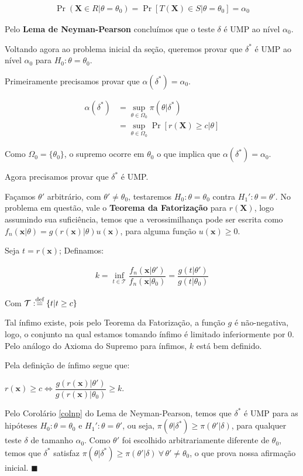 \documentclass[a4paper,10pt, notitlepage]{report}
\newcommand{\pow}{^}%
\newcommand{\pr}{\operatorname{Pr}} %
\newcommand{\bX}{\boldsymbol{X}} %
\newcommand{\bx}{\boldsymbol{x}} %
\newcommand{\defn}{\stackrel{\textrm{\scriptsize def}}{=}}
\begin{document}
	\begin{align*}
		\pr(\bX\in R|\theta=\theta_0)=\pr[T(\bX)\in S|\theta = \theta_0] = \alpha_0	
	\end{align*}
	
	Pelo \textbf{Lema de Neyman-Pearson} concluímos que o teste $\delta$ é UMP ao nível $\alpha_0$.
	
	
	Voltando agora ao problema inicial da seção, queremos provar que $\delta\pow*$ é UMP ao nível $\alpha_0$ para $H_0:\theta=\theta_0$.
	
	Primeiramente precisamos provar que $\alpha(\delta\pow*)=\alpha_0$.
	
	\begin{align*}
	\displaystyle\alpha(\delta\pow*)&=\sup_{\theta\in\Omega_0}\pi(\theta|\delta\pow*)\\
	&=\sup_{\theta\in\Omega_0}\pr[r(\bX)\geq c|\theta]
	\end{align*}
	
	Como $\Omega_0=\{\theta_0\}$, o supremo ocorre em $\theta_0$ o que implica que $\alpha(\delta\pow*)=\alpha_0$.
	
	Agora precisamos provar que $\delta\pow*$ é UMP.
	
	Façamos $\theta'$ arbitrário, com $\theta'\neq \theta_0$, testaremos $H_0:\theta=\theta_0$ contra $H_1':\theta=\theta'$.  No problema em questão, vale o \textbf{Teorema da Fatorização} para $r(\bX)$, logo assumindo sua suficiência, temos que a verossimilhança pode ser escrita como $f_n(\bx|\theta)=g(r(\bx)|\theta)u(\bx)$, para alguma função $u(\bx)\geq0$.
	
	Seja $t=r(\bx)$; Definamos:
	
	\begin{align*}
		k=\inf_{t\in\mathcal{T}}\dfrac{f_n(\bx|\theta')}{f_n(\bx|\theta_0)}=\dfrac{g(t|\theta')}{g(t|\theta_0)}
	\end{align*}
	
	Com $\mathcal{T}:\defn\{t|t\geq c\}$
	
	Tal ínfimo existe, pois pelo Teorema da Fatorização, a função $g$ é não-negativa, logo, o conjunto na qual estamos tomando ínfimo é limitado inferiormente por 0. Pelo análogo do Axioma do Supremo para ínfimos, $k$ está bem definido.
	
	Pela definição de ínfimo segue que:
	
	$r(\bx)\geq c\Leftrightarrow \dfrac{g(r(\bx)|\theta')}{g(r(\bx)|\theta_0)}\geq k$.
	
	Pelo Corolário \ref{colnp} do Lema de Neyman-Pearson, temos que $\delta\pow*$ é UMP para as hipóteses $H_0:\theta=\theta_0$ e $H_1':\theta=\theta'$, ou seja, $\pi(\theta|\delta\pow*)\geq\pi(\theta'|\delta)$, para qualquer teste $\delta$ de tamanho $\alpha_0$. Como $\theta'$ foi escolhido arbitrariamente diferente de $\theta_0$, temos que $\delta\pow*$ satisfaz $\pi(\theta|\delta\pow*)\geq\pi(\theta'|\delta)~\forall\,\theta'\neq\theta_0$, o que prova nossa afirmação inicial. $\blacksquare$
	
	
	
	
	
	
	
	
	
	
\end{document}
